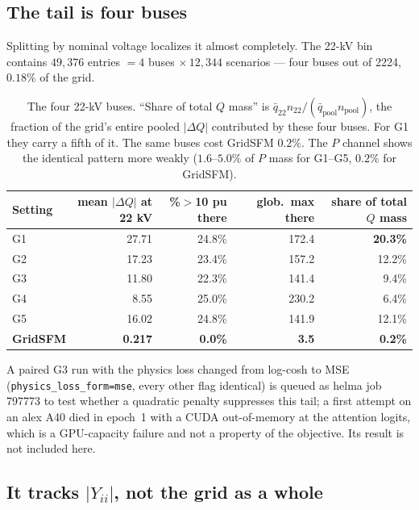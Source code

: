 \documentclass[10pt]{article}
\begin{document}
\subsection*{The tail is four buses}

Splitting by nominal voltage localizes it almost completely.  The 22-kV bin
contains $49{,}376$ entries $=4$ buses $\times\,12{,}344$ scenarios --- four
buses out of 2224, $0.18\%$ of the grid.

\begin{table}[H]
\centering\footnotesize
\begin{tabular}{lrrrr}
\toprule
Setting & mean $|\Delta Q|$ at 22 kV & \%$>$10 pu there & glob.\ max there & share of total $Q$ mass\\
\midrule
G1 & 27.71 & 24.8\% & 172.4 & \textbf{20.3\%}\\
G2 & 17.23 & 23.4\% & 157.2 & 12.2\%\\
G3 & 11.80 & 22.3\% & 141.4 & 9.4\%\\
G4 & 8.55 & 25.0\% & 230.2 & 6.4\%\\
G5 & 16.02 & 24.8\% & 141.9 & 12.1\%\\
\textbf{GridSFM} & \textbf{0.217} & \textbf{0.0\%} & \textbf{3.5} & \textbf{0.2\%}\\
\bottomrule
\end{tabular}
\caption{The four 22-kV buses.  ``Share of total $Q$ mass'' is
$\bar q_{22}n_{22}/(\bar q_{\text{pool}}n_{\text{pool}})$, the fraction of the
grid's entire pooled $|\Delta Q|$ contributed by these four buses.  For G1 they
carry a fifth of it.  The same buses cost GridSFM $0.2\%$.  The $P$ channel
shows the identical pattern more weakly ($1.6$--$5.0\%$ of $P$ mass for
G1--G5, $0.2\%$ for GridSFM).}
\end{table}

A paired G3 run with the physics loss changed from log-cosh to MSE
(\texttt{physics\_loss\_form=mse}, every other flag identical) is queued as
helma job 797773 to test whether a quadratic penalty suppresses this tail; a
first attempt on an alex A40 died in epoch~1 with a CUDA out-of-memory at the
attention logits, which is a GPU-capacity failure and not a property of the
objective.  Its result is not included here.

\subsection*{It tracks $|Y_{ii}|$, not the grid as a whole}
\end{document}

